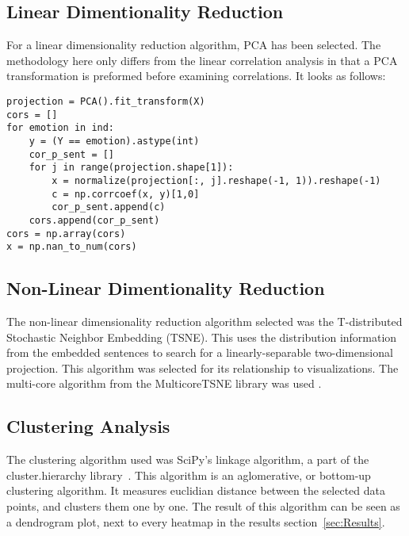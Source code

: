 \subsection{Linear Dimentionality Reduction}\label{sub:Linear Dimentionality Reduction}
For a linear dimensionality reduction algorithm, PCA has been selected. The methodology here only differs from the linear correlation analysis in that a PCA transformation is preformed before examining correlations. It looks as follows:

\begin{lstlisting}[caption={PCA correlation Algorithm},label=lst:pca,frame=single]
projection = PCA().fit_transform(X)
cors = []
for emotion in ind:
    y = (Y == emotion).astype(int)
    cor_p_sent = []
    for j in range(projection.shape[1]):
        x = normalize(projection[:, j].reshape(-1, 1)).reshape(-1)
        c = np.corrcoef(x, y)[1,0]
        cor_p_sent.append(c)
    cors.append(cor_p_sent)
cors = np.array(cors)
x = np.nan_to_num(cors)
\end{lstlisting}


\subsection{Non-Linear Dimentionality Reduction}\label{sub:Non-Linear Dimentionality Reduction}
The non-linear dimensionality reduction algorithm selected was the T-distributed Stochastic Neighbor Embedding (TSNE). This uses the distribution information from the embedded sentences to search for a linearly-separable two-dimensional projection. This algorithm was selected for its relationship to visualizations. The multi-core algorithm from the MulticoreTSNE library was used \cite{TODO}.


\subsection{Clustering Analysis}\label{sub:Clustering Analysis}
The clustering algorithm used was SciPy's linkage algorithm, a part of the cluster.hierarchy library~\cite{TODO}. This algorithm is an aglomerative, or bottom-up clustering algorithm. It measures euclidian distance between the selected data points, and clusters them one by one. The result of this algorithm can be seen as a dendrogram plot, next to every heatmap in the results section~\ref{sec:Results}.
